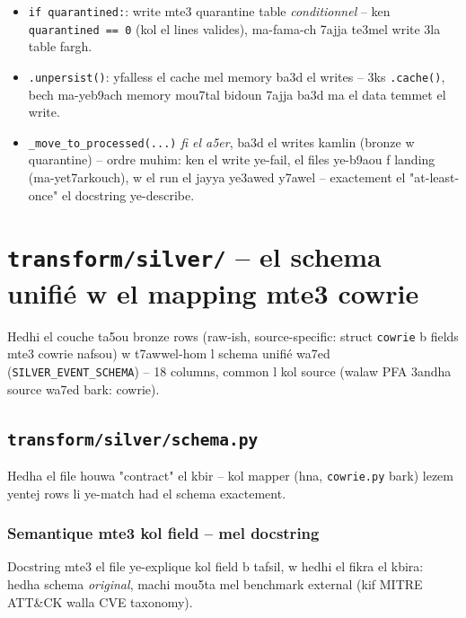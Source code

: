 \documentclass[11pt,a4paper]{report}
\DeclareRobustCommand{\code}[1]{\texttt{#1}}
\DeclareRobustCommand{\file}[1]{\texttt{\color{amber}#1}}
\begin{document}
\begin{itemize}
        (mathalan "el a5er 7 iyem") ma-y9raouch el table kamla.
        \code{mergeSchema=true}: ken schema mte3 cowrie yetbeddel (field
        jdid f version jdida mte3 cowrie), Delta ye9bal el evolution
        automatiquement, machi ye-crash 3la mismatch.
  \item \code{if quarantined:}: write mte3 quarantine table \emph{conditionnel}
        -- ken \code{quarantined == 0} (kol el lines valides), ma-fama-ch
        7ajja te3mel write 3la table fargh.
  \item \code{.unpersist()}: yfalless el cache mel memory ba3d el writes
        -- 3ks \code{.cache()}, bech ma-yeb9ach memory mou7tal bidoun
        7ajja ba3d ma el data temmet el write.
  \item \code{\_move\_to\_processed(...)} \emph{fi el a5er}, ba3d el
        writes kamlin (bronze w quarantine) -- ordre muhim: ken el write
        ye-fail, el files ye-b9aou f landing (ma-yet7arkouch), w el run
        el jayya ye3awed y7awel -- exactement el "at-least-once" el
        docstring ye-describe.
\end{itemize}

\chapter{\file{transform/silver/} -- el schema unifié w el mapping mte3 cowrie}

Hedhi el couche ta5ou bronze rows (raw-ish, source-specific: struct
\code{cowrie} b fields mte3 cowrie nafsou) w t7awwel-hom l schema unifié
wa7ed (\code{SILVER\_EVENT\_SCHEMA}) -- 18 columns, common l kol source
(walaw PFA 3andha source wa7ed bark: cowrie).

\section{\file{transform/silver/schema.py}}

Hedha el file houwa "contract" el kbir -- kol mapper (hna, \code{cowrie.py}
bark) lezem yentej rows li ye-match had el schema exactement.

\subsection{Semantique mte3 kol field -- mel docstring}

Docstring mte3 el file ye-explique kol field b tafsil, w hedhi el fikra el
kbira: hedha schema \emph{original}, machi mou5ta mel benchmark external
(kif MITRE ATT\&CK walla CVE taxonomy).
\end{document}
